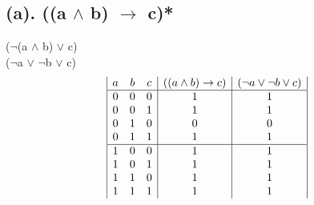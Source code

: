 \documentclass[a4paper]{article}
\begin{document}
\subsection{(a). ((a $\wedge $ b) $\rightarrow $ c)*}
($\neg $(a $\wedge $ b) $\vee $ c)\\
($\neg $a $\vee $ $\neg $b $\vee $ c)
\begin{displaymath}
    \begin{array}{|c c c|c|c|}
        a & b & c & ((a \wedge b) \rightarrow c) & (\neg a \vee \neg b \vee c) \\
        \hline
        0 & 0 & 0 & 1                            & 1                           \\
        0 & 0 & 1 & 1                            & 1                           \\
        0 & 1 & 0 & 0                            & 0                           \\
        0 & 1 & 1 & 1                            & 1                           \\
        \hline
        1 & 0 & 0 & 1                            & 1                           \\
        1 & 0 & 1 & 1                            & 1                           \\
        1 & 1 & 0 & 1                            & 1                           \\
        1 & 1 & 1 & 1                            & 1                           \\
    \end{array}
\end{displaymath}
\end{document}
